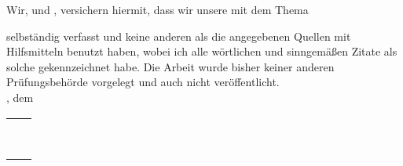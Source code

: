 \clearpage
{}

Wir, \autorEinsName  und \autorZweiName, versichern hiermit, dass wir unsere \textbf{\betreff} mit dem Thema
\begin{quote}
\textit{\kompletterTitel}
\end{quote}
selbständig verfasst und keine anderen als die angegebenen Quellen mit Hilfsmitteln benutzt haben,
wobei ich alle wörtlichen und sinngemäßen Zitate als solche gekennzeichnet habe. Die Arbeit
wurde bisher keiner anderen Prüfungsbehörde vorgelegt und auch nicht veröffentlicht. \\[6ex]

\abgabeOrt, dem \abgabeTermin\\

\begin{tabular}{ll}
	\rule[-0.2cm]{5.5cm}{0.5pt} & \rule[-0.2cm]{5.5cm}{0.5pt}\\
	\\
	\textsc{\autorEinsName} & \textsc{\autorZweiName}\\
\end{tabular}


